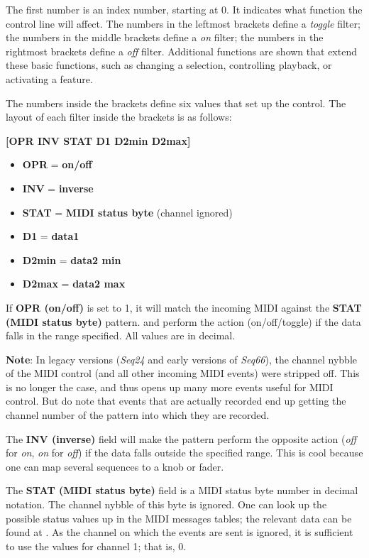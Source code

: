    The first number is an index number, starting at 0.  It indicates what
   function the control line will affect.
   The numbers in the leftmost brackets define a \textsl{toggle} filter;
   the numbers in the middle brackets define a \textsl{on} filter;
   the numbers in the rightmost brackets define a \textsl{off} filter.
   Additional functions are shown that extend these basic functions,
   such as changing a selection, controlling playback, or activating a feature.

   The numbers inside the brackets define six values that set up the control.
   The layout of each filter inside the brackets is as follows:

      \textbf{[OPR INV STAT D1 D2min D2max]}

   \begin{itemize}
      \item \textbf{OPR} = \textbf{on/off}
      \item \textbf{INV} = \textbf{inverse}
      \item \textbf{STAT} = \textbf{MIDI status byte} (channel ignored) 
      \item \textbf{D1} = \textbf{data1}
      \item \textbf{D2min} = \textbf{data2 min}
      \item \textbf{D2max} = \textbf{data2 max}
   \end{itemize}

   If \textbf{OPR (on/off)} is set to 1, it will match the incoming MIDI
   against the \textbf{STAT (MIDI status byte)} pattern.
   and perform the action (on/off/toggle) if the data
   falls in the range specified.  All values are in decimal.

   \textbf{Note}: In legacy versions (\textsl{Seq24} and early versions
   of \textsl{Seq66}), the channel nybble of the MIDI control (and all
   other incoming MIDI events) were stripped off.
   This is no longer the case, and thus opens up many more events useful for
   MIDI control.   But do note that events that are actually recorded end up
   getting the channel number of the pattern into which they are recorded.

   The \textbf{INV (inverse)} field will make the pattern perform the opposite
   action (\textsl{off} for \textsl{on}, \textsl{on} for \textsl{off}) if the
   data falls outside the specified range.  This is cool because one can map
   several sequences to a knob or fader.

   The \textbf{STAT (MIDI status byte)} field is a MIDI status byte number in
   decimal notation.  The channel nybble of this byte is ignored.  One can look
   up the possible status values up in the MIDI messages tables; the relevant
   data can be found at \cite{midicontroltable}.  As the channel on which the
   events are sent is ignored, it is sufficient to use the values for channel
   1; that is, 0.

